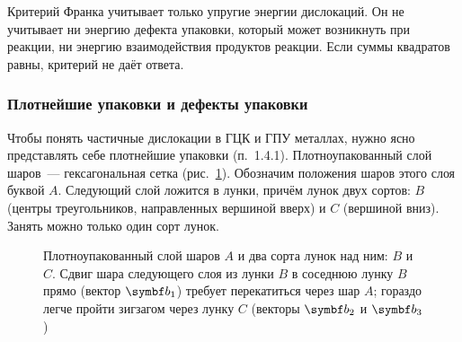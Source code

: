 \begin{vnimanie}
Критерий Франка учитывает только упругие энергии дислокаций. Он не
учитывает ни энергию дефекта упаковки, который может возникнуть при
реакции, ни энергию взаимодействия продуктов реакции. Если суммы
квадратов равны, критерий не даёт ответа.
\end{vnimanie}

\subsubsection{Плотнейшие упаковки и дефекты упаковки}

Чтобы понять частичные дислокации в ГЦК и ГПУ металлах, нужно ясно
представлять себе плотнейшие упаковки (п.~1.4.1). Плотноупакованный
слой шаров~— гексагональная сетка (рис.~\ref{fig:abc-layer}). Обозначим
положения шаров этого слоя буквой $A$. Следующий слой ложится в лунки,
причём лунок двух сортов: $B$ (центры треугольников, направленных
вершиной вверх) и $C$ (вершиной вниз). Занять можно только один сорт
лунок.

\begin{figure}[ht]
\centering
{}
\caption{Плотноупакованный слой шаров $A$ и два сорта лунок над ним: $B$ и
$C$. Сдвиг шара следующего слоя из лунки $B$ в соседнюю лунку $B$ прямо
(вектор $\vb b_1$) требует перекатиться через шар $A$; гораздо легче
пройти зигзагом через лунку $C$ (векторы $\vb b_2$ и $\vb b_3$)}
\label{fig:abc-layer}
\end{figure}

